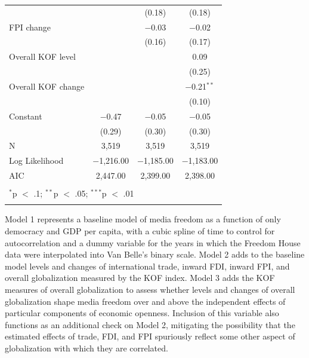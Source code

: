 \documentclass[12pt,a4paper]{article}\usepackage[]{graphicx}\usepackage[]{color}
\begin{document}
{\begin{table}[!htbp]
\begin{tabular}{@{\extracolsep{5pt}}lccc}
  &  & (0.18) & (0.18) \\ 
  FPI change &  & $-$0.03 & $-$0.02 \\ 
  &  & (0.16) & (0.17) \\ 
  Overall KOF level &  &  & 0.09 \\ 
  &  &  & (0.25) \\ 
  Overall KOF change &  &  & $-$0.21$^{**}$ \\ 
  &  &  & (0.10) \\ 
  Constant & $-$0.47 & $-$0.05 & $-$0.05 \\ 
  & (0.29) & (0.30) & (0.30) \\ 
 N & 3,519 & 3,519 & 3,519 \\ 
Log Likelihood & $-$1,216.00 & $-$1,185.00 & $-$1,183.00 \\ 
AIC & 2,447.00 & 2,399.00 & 2,398.00 \\ 
\hline \\[-1.8ex] 
\multicolumn{4}{l}{$^{*}$p $<$ .1; $^{**}$p $<$ .05; $^{***}$p $<$ .01} \\ 
\normalsize 
\end{tabular} 
\end{table} 


\clearpage
}
Model 1 represents a baseline model of media freedom as a function of only democracy and GDP per capita, with a cubic spline of time to control for autocorrelation \parencite{Beck:1998wg} and a dummy variable for the years in which the Freedom House data were interpolated into Van Belle's binary scale. Model 2 adds to the baseline model levels and changes of international trade, inward FDI, inward FPI, and overall globalization measured by the KOF index. Model 3 adds the KOF measures of overall globalization to assess whether levels and changes of overall globalization shape media freedom over and above the independent effects of particular components of economic openness. Inclusion of this variable also functions as an additional check on Model 2, mitigating the possibility that the estimated effects of trade, FDI, and FPI spuriously reflect some other aspect of globalization with which they are correlated.
\end{document}
